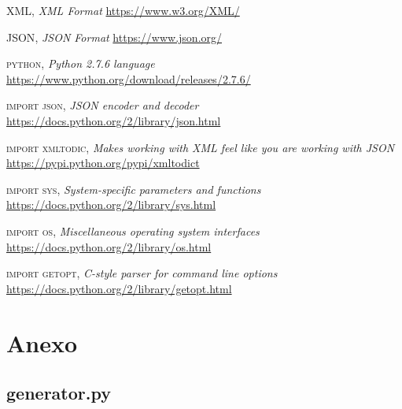 \documentclass[a4paper,11pt]{book}
\begin{document}
 

\begin{thebibliography}{aaaa}


 \textsc{XML},
\textit{XML Format}
\url{https://www.w3.org/XML/} 


 \textsc{JSON},
\textit{JSON Format}
\url{https://www.json.org/} 


 \textsc{python},
\textit{Python 2.7.6 language}
\url{https://www.python.org/download/releases/2.7.6/} 


 \textsc{import json},
\textit{JSON encoder and decoder}
\url{https://docs.python.org/2/library/json.html} 

 \textsc{import xmltodic},
\textit{Makes working with XML feel like you are working with JSON}
\url{https://pypi.python.org/pypi/xmltodict} 

 \textsc{import sys},
\textit{System-specific parameters and functions}
\url{https://docs.python.org/2/library/sys.html} 

 \textsc{import os},
\textit{Miscellaneous operating system interfaces}
\url{https://docs.python.org/2/library/os.html} 

 \textsc{import getopt},
\textit{C-style parser for command line options}
\url{https://docs.python.org/2/library/getopt.html}


\end{thebibliography}
 

\chapter{Anexo}
\section{generator.py}



%
%
%
%

%
%

\thispagestyle{empty}
\end{document}
